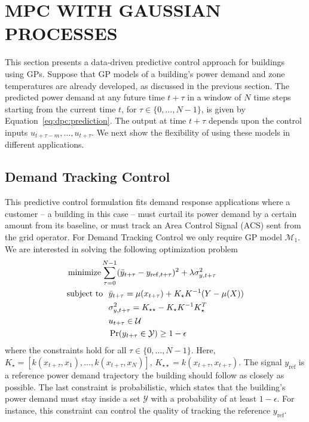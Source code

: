 \section{MPC WITH GAUSSIAN PROCESSES}
\label{S:dpc}

This section presents a data-driven predictive control approach for buildings using GPs.
Suppose that GP models of a building's power demand and zone temperatures are already developed, as discussed in the previous section.
The predicted power demand at any future time $t+\tau$ in a window of $N$ time steps starting from the current time $t$, for \(\tau \in \{0,\dots,N-1\}\), is given by Equation~\eqref{eq:dpc:prediction}.
The output at time \(t+\tau\) depends upon %
the control inputs \(u_{t+\tau-m}, \dots, u_{t+\tau}\).
We next show the flexibility of using these models in different applications.

\subsection{Demand Tracking Control}
This predictive control formulation fits demand response applications where a customer -- a building in this case -- must curtail its power demand by a certain amount from its baseline, or must track an Area Control Signal (ACS) sent from the grid operator.
For Demand Tracking Control we only require GP model \(\mathcal{M}_1\).
We are interested in solving the following optimization problem
\begin{align}
  &\operatorname*{minimize} \sum_{\tau=0}^{N-1} (\bar{y}_{t+\tau} - y_{\mathrm{ref},t+\tau})^2 + \lambda \sigma^2_{y,t+\tau} \label{E:mpc:tracking} \\
  & 
    \begin{aligned}
      \text{subject to}\ \  & \bar{y}_{t+\tau} = \mu(x_{t+\tau}) + K_\star K^{-1} (Y - \mu(X)) \nonumber\\
      & \sigma^2_{y,t+\tau} = K_{\star \star} - K_\star K^{-1} K_\star^T \\
      & u_{t+\tau} \in \mathcal{U} \nonumber \\
      & \Pr(y_{t+\tau} \in \mathcal{Y}) \geq 1 - \epsilon \nonumber
    \end{aligned}
\end{align}
where the constraints hold for all \(\tau \in \{0,\dots,N-1\}\).
Here, \(K_\star = [k(x_{t+\tau}, x_1), \dots, k(x_{t+\tau}, x_N)]\), \(K_{\star \star} = k(x_{t+\tau}, x_{t+\tau})\). %
The signal $y_{\mathrm{ref}}$ is a reference power demand trajectory the building should follow as closely as possible.
The last constraint is probabilistic, which states that the building's power demand must stay inside a set $\mathcal{Y}$ with a probability of at least $1 - \epsilon$.
For instance, this constraint can control the quality of tracking the reference $y_{\mathrm{ref}}$.

